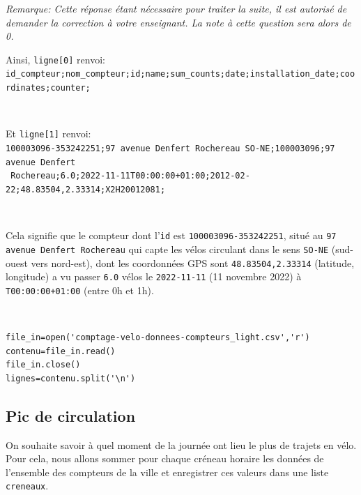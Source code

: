 
\textit{Remarque: Cette réponse étant nécessaire pour traiter la suite, il est autorisé de demander la correction à votre enseignant. La note à cette question sera alors de 0.}

Ainsi, \verb?ligne[0]? renvoi:\\
\verb?id_compteur;nom_compteur;id;name;sum_counts;date;installation_date;coordinates;counter;?

~\

Et \verb?ligne[1]? renvoi:\\
\verb?100003096-353242251;97 avenue Denfert Rochereau SO-NE;100003096;97 avenue Denfert?\\ \verb? Rochereau;6.0;2022-11-11T00:00:00+01:00;2012-02-22;48.83504,2.33314;X2H20012081;?

~\

Cela signifie que le compteur dont l'\verb?id? est \verb?100003096-353242251?, situé au \verb?97 avenue Denfert Rochereau? qui capte les vélos circulant dans le sens \verb?SO-NE? (sud-ouest vers nord-est), dont les coordonnées GPS sont \verb?48.83504,2.33314? (latitude, longitude) a vu passer \verb?6.0? vélos le \verb?2022-11-11? (11 novembre 2022) à \verb?T00:00:00+01:00? (entre 0h et 1h).

\begin{solution}~\ \\
\begin{verbatim}
file_in=open('comptage-velo-donnees-compteurs_light.csv','r')
contenu=file_in.read()
file_in.close()
lignes=contenu.split('\n')
\end{verbatim}
\end{solution}

\subsection{Pic de circulation}

On souhaite savoir à quel moment de la journée ont lieu le plus de trajets en vélo. Pour cela, nous allons sommer pour chaque créneau horaire les données de l'ensemble des compteurs de la ville et enregistrer ces valeurs dans une liste \verb?creneaux?.



